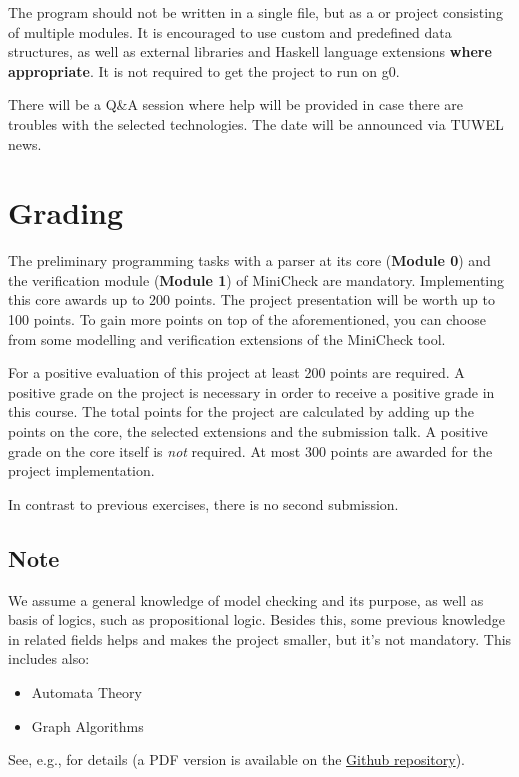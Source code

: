 \documentclass{article}
\begin{document}
The program should not be written in a single file, but as a \href{https://docs.haskellstack.org/en/stable/README/}{} 
or \href{https://cabal.readthedocs.io/en/3.4/}{} project consisting of multiple modules. 
It is encouraged to use custom and predefined data structures, as well as external libraries 
and Haskell language extensions \textbf{where appropriate}. It is not required to get the project to run on g0.

There will be a Q\&A session where help will be provided in case there are troubles with the selected technologies. 
The date will be announced via TUWEL news.

\section{Grading}

The preliminary programming tasks with a parser at its core (\textbf{Module 0}) and 
the verification module (\textbf{Module 1}) of MiniCheck are mandatory. 
Implementing this core awards up to 200 points. The project presentation will be worth up to 100 points. 
To gain more points on top of the aforementioned, you can choose from some modelling 
and verification extensions of the MiniCheck tool.

For a positive evaluation of this project at least 200 points are required. 
A positive grade on the project is necessary in order to receive a positive grade in this course. 
The total points for the project are calculated by adding up the points on the core, 
the selected extensions and the submission talk. A positive grade on the core itself is \textit{not} required. 
At most 300 points are awarded for the project implementation.

In contrast to previous exercises, there is no second submission.

\subsection{Note}
We assume a general knowledge of model checking and its purpose, as well as basis of logics,
such as propositional logic.  Besides this, some previous knowledge in related fields helps 
and makes the project smaller, but it's not mandatory. This includes also:
\begin{itemize}
    \item Automata Theory
    \item Graph Algorithms
\end{itemize}
See, e.g., \cite{BaKa} for details (a PDF version is available on the 
\href{https://github.com/francescopont/MiniCheck.git}{Github repository}).
\end{document}
